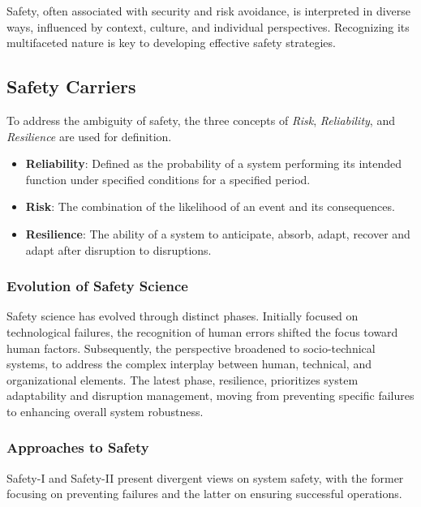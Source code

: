 

Safety, often associated with security and risk avoidance, is interpreted in diverse ways, influenced by context, culture, and individual perspectives. Recognizing its multifaceted nature is key to developing effective safety strategies.

\subsection*{Safety Carriers}

To address the ambiguity of safety, the three concepts of \textit{Risk}, \textit{Reliability}, and \textit{Resilience} are used for definition. 

\begin{itemize}
    \item \textbf{Reliability}: Defined as the probability of a system performing its intended function under specified conditions for a specified period.
    \item \textbf{Risk}: The combination of the likelihood of an event and its consequences.
    \item \textbf{Resilience}: The ability of a system to anticipate, absorb, adapt, recover and adapt after disruption to disruptions.
\end{itemize}

\subsubsection*{Evolution of Safety Science}

Safety science has evolved through distinct phases. Initially focused on technological failures, the recognition of human errors shifted the focus toward human factors. Subsequently, the perspective broadened to socio-technical systems, to address the complex interplay between human, technical, and organizational elements. The latest phase, resilience, prioritizes system adaptability and disruption management, moving from preventing specific failures to enhancing overall system robustness.

\subsubsection*{Approaches to Safety}

Safety-I and Safety-II present divergent views on system safety, with the former focusing on preventing failures and the latter on ensuring successful operations.

